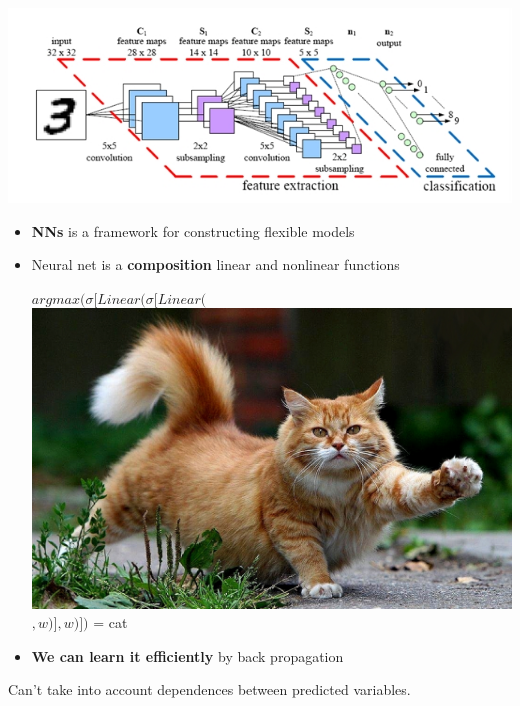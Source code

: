 \documentclass{beamer}
\begin{document}
\begin{frame}
	\centering \includegraphics[scale=0.5]{img/dnn} 
	
	\begin{itemize}
		\item \textbf{NNs} is a framework for constructing flexible models
		
		\item Neural net is a \textbf{composition} linear and nonlinear functions 	
			\vspace{0.1cm}
			\begin{center}
				\Large $argmax(\sigma[Linear(\sigma[Linear($\includegraphics[scale=0.03]{img/cat}$, w)], w)])$ = cat
			\end{center}
			\vspace{0.1cm}
		
		\item \textbf{We can learn it efficiently} by back propagation
		\end{itemize}

	
		\begin{tcolorbox}[colback=gray!2, colframe=red!90, title=Problem]
			\centering Can't take into account dependences between predicted variables. 
		\end{tcolorbox}
\end{frame}
\end{document}
